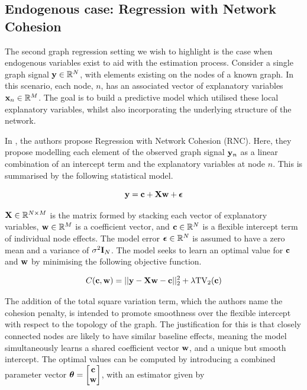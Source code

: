 \subsection{Endogenous case: Regression with Network Cohesion}

The second graph regression setting we wish to highlight is the case when endogenous variables exist to aid with the estimation process. Consider a single graph signal $\mathbf{y} \in \mathbb{R}^N$, with elements existing on the nodes of a known graph. In this scenario, each node, $n$, has an associated vector of explanatory variables $\mathbf{x}_n \in \mathbb{R}^M$. The goal is to build a predictive model which utilised these local explanatory variables, whilst also incorporating the underlying structure of the network. 

In \cite{Li2019}, the authors propose Regression with Network Cohesion (RNC). Here, they propose modelling each element of the observed graph signal $\mathbf{y}_n$ as a linear combination of an intercept term and the explanatory variables at node $n$. This is summarised by the following statistical model. 

\begin{equation}
    \mathbf{y} = \mathbf{c} + \mathbf{X} \mathbf{w} + \boldsymbol{\epsilon}
\end{equation}

$\mathbf{X} \in \mathbb{R}^{N \times M}$ is the matrix formed by stacking each vector of explanatory variables, $\mathbf{w} \in \mathbb{R}^M$ is a coefficient vector, and $\mathbf{c} \in \mathbb{R}^N$ is a flexible intercept term of individual node effects. The model error $\boldsymbol{\epsilon} \in \mathbb{R}^N$ is assumed to have a zero mean and a variance of $\sigma^2 \mathbf{I}_N$. The model seeks to learn an optimal value for $\mathbf{c}$ and $\mathbf{w}$ by minimising the following objective function. 

\begin{equation}
    \label{eq:RNC_objective}
    C(\mathbf{c}, \mathbf{w}) = ||\mathbf{y} - \mathbf{X} \mathbf{w} - \mathbf{c} ||^2_2 + \lambda \text{TV}_2(\mathbf{c})
\end{equation}

The addition of the total square variation term, which the authors name the cohesion penalty, is intended to promote smoothness over the flexible intercept with respect to the topology of the graph. The justification for this is that closely connected nodes are likely to have similar baseline effects, meaning the model simultaneously learns a shared coefficient vector $\mathbf{w}$, and a unique but smooth intercept. The optimal values can be computed by introducing a combined parameter vector $\boldsymbol{\theta} = \begin{bmatrix} \mathbf{c} \\ \mathbf{w}  \end{bmatrix}$, with an estimator given by 

